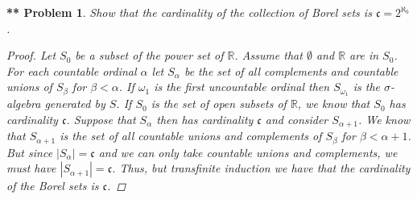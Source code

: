 \documentclass{article}
\newtheorem{**}{** Problem}
\begin{document}
\begin{flushleft}
\begin{**}
Show that the cardinality of the collection of Borel sets is $\mathfrak{c} = 2^{\aleph_0}$.
\begin{proof}
Let $S_0$ be a subset of the power set of $\mathbb{R}$. Assume that $\emptyset$ and $\mathbb{R}$ are in $S_0$. For each countable ordinal $\alpha$ let $S_{\alpha}$ be the set of all complements and countable unions of $S_{\beta}$ for $\beta < \alpha$. If $\omega_1$ is the first uncountable ordinal then $S_{\omega_1}$ is the $\sigma$-algebra generated by $S$. If $S_0$ is the set of open subsets of $\mathbb{R}$, we know that $S_0$ has cardinality $\mathfrak {c}$. Suppose that $S_{\alpha}$ then has cardinality $\mathfrak {c}$ and consider $S_{\alpha + 1}$. We know that $S_{\alpha + 1}$ is the set of all countable unions and complements of $S_{\beta}$ for $\beta < \alpha + 1$. But since $|S_{\alpha}| = \mathfrak{c}$ and we can only take countable unions and complements, we must have $|S_{\alpha + 1}| = \mathfrak{c}$. Thus, but transfinite induction we have that the cardinality of the Borel sets is $\mathfrak{c}$.
\end{proof}
\end{**}

\end{flushleft}
\end{document}
